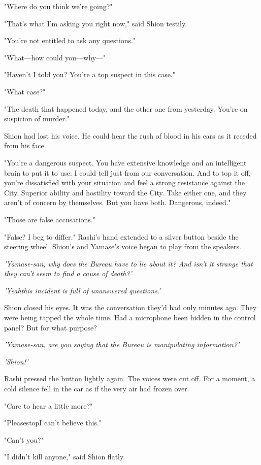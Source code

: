 "Where do you think we're going?"

"That's what I'm asking you right now," said Shion testily.

"You're not entitled to ask any questions."

"What---how could you---why---"

"Haven't I told you? You're a top suspect in this case."

"What case?"

"The death that happened today, and the other one from yesterday. You're
on suspicion of murder."

Shion had lost his voice. He could hear the rush of blood in his ears as
it receded from his face.

"You're a dangerous suspect. You have extensive knowledge and an
intelligent brain to put it to use. I could tell just from our
conversation. And to top it off, you're dissatisfied with your situation
and feel a strong resistance against the City. Superior ability and
hostility toward the City. Take either one, and they aren't of concern
by themselves. But you have both. Dangerous, indeed."

"Those are false accusations."

"False? I beg to differ." Rashi's hand extended to a silver button
beside the steering wheel. Shion's and Yamase's voice began to play from
the speakers.

\emph{'Yamase-san, why does the Bureau have to lie about it? And isn't it
strange that they can't seem to find a cause of death?'}

\emph{'Yeah\el this incident is full of unanswered questions.'}

Shion closed his eyes. It was the conversation they'd had only minutes
ago. They were being tapped the whole time. Had a microphone been hidden
in the control panel? But for what purpose?

\emph{'Yamase-san, are you saying that the Bureau is manipulating
information?'}

\emph{'Shion!'}

Rashi pressed the button lightly again. The voices were cut off. For a
moment, a cold silence fell in the car as if the very air had frozen
over.

"Care to hear a little more?"

"Please\el stop\el I can't believe this."

"Can't you?"

"I didn't kill anyone," said Shion flatly.

